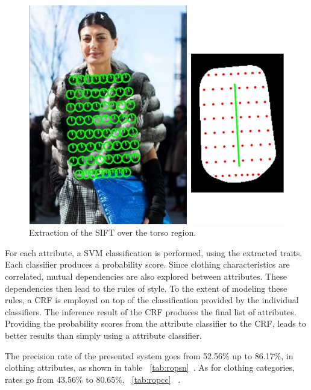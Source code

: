 \documentclass[titlepage,12pt,a4paper,times]{book}
\begin{document}
\begin{figure}[!h]
\centering
\includegraphics[scale=0.7]{images/2_3_fig3.jpg}
\caption{Extraction of the \ac{SIFT} over the torso region.}
\label{fig:est}
\end{figure}
\FloatBarrier

For each attribute, a \ac{SVM} classification is performed, using the
extracted traits. Each classifier produces a probability score.
Since clothing characteristics are correlated, mutual dependencies are also
explored between attributes. These dependencies then lead to the rules of style.
To the extent of modeling these rules, a \ac{CRF} is employed on top of the
classification provided by the individual classifiers. The inference result of
the \ac{CRF} produces the final list of attributes. Providing the probability
scores from the attribute classifier to the \ac{CRF}, leads to better results
than simply using a attribute classifier.

The precision rate of the presented system goes from 52.56\% up to 86.17\%,
in clothing attributes, as shown in table ~\ref{tab:ropsn}~\citep{2}. As for
clothing categories, rates go from 43.56\% to 80.65\%, ~\ref{tab:ropcc}
~\citep{2}.
\end{document}
